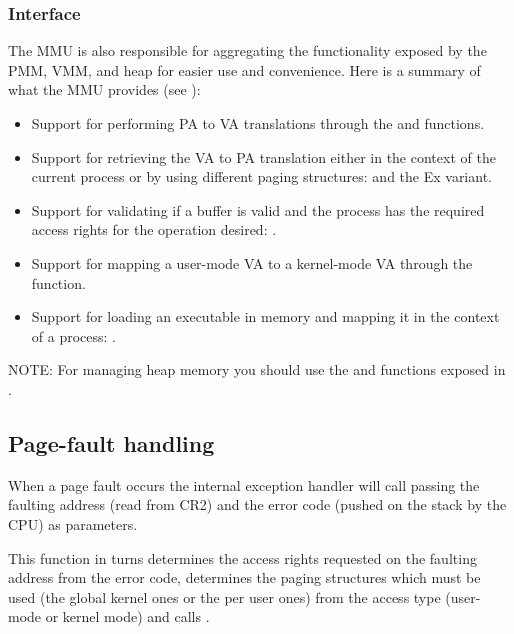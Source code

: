 \begin{appendices}
\subsubsection{Interface}
The MMU is also responsible for aggregating the functionality exposed by the PMM, VMM, and heap for
easier use and convenience. Here is a summary of what the MMU provides (see ):
\begin{itemize}
	\item Support for performing PA to VA translations through the  and
 functions.

	\item Support for retrieving the VA to PA translation either in the context of the current
process or by using different paging structures:  and the Ex variant.

	\item Support for validating if a buffer is valid and the process has the required access rights
for the operation desired: .

	\item Support for mapping a user-mode VA to a kernel-mode VA through the 
 function.

	\item Support for loading an executable in memory and mapping it in the context of a process:
.
\end{itemize}

NOTE: For managing heap memory you should use the  and 
 functions exposed in .

\subsection{Page-fault handling}
\label{sect:PfHandling}

When a page fault occurs the internal exception handler will call  passing
the faulting address (read from CR2) and the error code (pushed on the stack by the CPU) as
parameters.

This function in turns determines the access rights requested on the faulting address from the error
code, determines the paging structures which must be used (the global kernel ones or the per user
ones) from the access type (user-mode or kernel mode) and calls .


\end{appendices}
